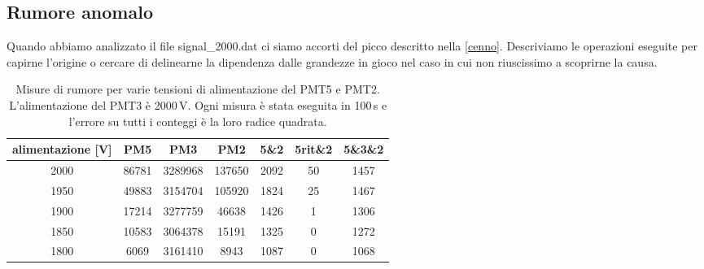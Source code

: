\subsection{Rumore anomalo}
\label{rumore}

Quando abbiamo analizzato il file signal\_2000.dat ci siamo accorti del picco descritto nella \autoref{cenno}. Descriviamo le operazioni eseguite per capirne l'origine o cercare di delinearne la dipendenza dalle grandezze in gioco nel caso in cui non riuscissimo a scoprirne la causa.


\begin{table}
\centering
\begin{tabular}{c|c|c|c|c|c|c}
\hline
alimentazione [V] & PM5 & PM3 & PM2 & 5\&2 & 5rit\&2 & 5\&3\&2 \\
\hline
2000 & 86781 & 3289968 & 137650 & 2092 & 50 & 1457 \\
1950 & 49883 & 3154704 & 105920 & 1824 & 25 & 1467 \\
1900 & 17214 & 3277759 & 46638 & 1426 & 1 & 1306 \\
1850 & 10583 & 3064378 & 15191 & 1325 & 0 & 1272 \\
1800 & 6069 & 3161410 & 8943 & 1087 & 0 & 1068 \\
\hline
\end{tabular}
\caption{Misure di rumore per varie tensioni di alimentazione del PMT5 e PMT2. L'alimentazione del PMT3 è 2000\,V. Ogni misura è stata eseguita in 100\,s e l'errore su tutti i conteggi è la loro radice quadrata.}
\label{orrore}
\end{table}